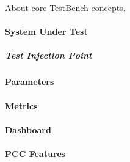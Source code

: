 About core TestBench concepts.

\paragraph{System Under Test}
\subparagraph{Test Injection Point}
\paragraph{Parameters}
\paragraph{Metrics}
\paragraph{Dashboard}
\paragraph{PCC Features}